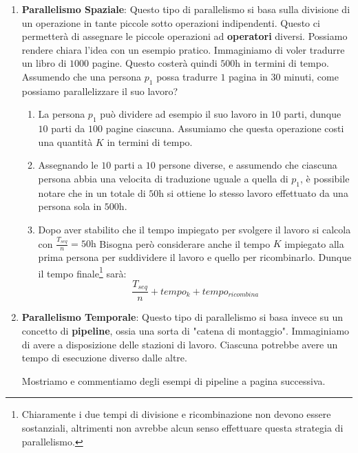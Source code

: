 \documentclass{article}
\begin{document}
\begin{enumerate}
    \item \textbf{Parallelismo Spaziale}: Questo tipo di parallelismo si basa sulla divisione di un operazione in tante piccole sotto operazioni indipendenti. Questo ci permetterà di assegnare le piccole operazioni ad \textbf{operatori} diversi. Possiamo rendere chiara l'idea con un esempio pratico. Immaginiamo di voler tradurre un libro di $1000$ pagine. Questo costerà quindi $500$h in termini di tempo. Assumendo che una persona $p_{1}$ possa tradurre $1$ pagina in $30$ minuti, come possiamo parallelizzare il suo lavoro?
    \vspace*{15px}
    \begin{enumerate}
        \item La persona $p_{1}$ può dividere ad esempio il suo lavoro in $10$ parti, dunque $10$ parti da $100$ pagine ciascuna. Assumiamo che questa operazione costi una quantità $K$ in termini di tempo.
        \vspace*{8px}
        \item Assegnando le $10$ parti a $10$ persone diverse, e assumendo che ciascuna persona abbia una velocita di traduzione uguale a quella di $p_{1}$, è possibile notare che in un totale di $50$h si ottiene lo stesso lavoro effettuato da una persona sola in $500$h.
        \vspace*{8px}
        \item Dopo aver stabilito che il tempo impiegato per svolgere il lavoro si calcola con $\frac{T_{seq}}{n} = 50\text{h}$ Bisogna però considerare anche il tempo $K$ impiegato alla prima persona per suddividere il lavoro e quello per ricombinarlo. Dunque il tempo finale\footnote{Chiaramente i due tempi di divisione e ricombinazione non devono essere sostanziali, altrimenti non avrebbe alcun senso effettuare questa strategia di parallelismo.} sarà:
        \[ \frac{T_{seq}}{n} + tempo_{k} + tempo_{ricombina} \]
    \end{enumerate}

    \vspace*{15px}

    \item \textbf{Parallelismo Temporale}: Questo tipo di parallelismo si basa invece su un concetto di \textbf{pipeline}, ossia una sorta di "catena di montaggio". Immaginiamo di avere a disposizione delle stazioni di lavoro. Ciascuna potrebbe avere un tempo di esecuzione diverso dalle altre. 

    Mostriamo e commentiamo degli esempi di pipeline a pagina successiva.


\end{enumerate}
\end{document}

